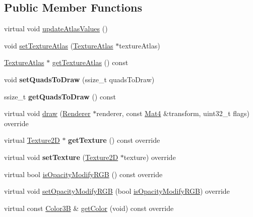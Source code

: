 \subsection*{Public Member Functions}
\begin{DoxyCompactItemize}
\item 
virtual void \hyperlink{classAtlasNode_ace1c88a0277a601bc02180da9641ebcd}{update\+Atlas\+Values} ()
\item 
void \hyperlink{classAtlasNode_ae008de73e7b0be719b73b57a94722894}{set\+Texture\+Atlas} (\hyperlink{classTextureAtlas}{Texture\+Atlas} $\ast$texture\+Atlas)
\item 
\hyperlink{classTextureAtlas}{Texture\+Atlas} $\ast$ \hyperlink{classAtlasNode_adce0f217e64e54bb095835acbea6174f}{get\+Texture\+Atlas} () const
\item 
\mbox{\label{classAtlasNode_a75735e107d32bdd019216b8b3a706467}} 
void {\bfseries set\+Quads\+To\+Draw} (ssize\+\_\+t quads\+To\+Draw)
\item 
\mbox{\label{classAtlasNode_a5fd045ec7e53606e5f58947359a3c332}} 
ssize\+\_\+t {\bfseries get\+Quads\+To\+Draw} () const
\item 
virtual void \hyperlink{classAtlasNode_aa396ca085059861b67e3ad9471de797c}{draw} (\hyperlink{classRenderer}{Renderer} $\ast$renderer, const \hyperlink{classMat4}{Mat4} \&transform, uint32\+\_\+t flags) override
\item 
\mbox{\label{classAtlasNode_a2f3cbc0c526c36bba08950158672b35e}} 
virtual \hyperlink{classTexture2D}{Texture2D} $\ast$ {\bfseries get\+Texture} () const override
\item 
\mbox{\label{classAtlasNode_ab6631fcde0f4849b47a93667b10c02e8}} 
virtual void {\bfseries set\+Texture} (\hyperlink{classTexture2D}{Texture2D} $\ast$texture) override
\item 
virtual bool \hyperlink{classAtlasNode_a3aa161e8abaff7422b7f9ef895f9439d}{is\+Opacity\+Modify\+R\+GB} () const override
\item 
virtual void \hyperlink{classAtlasNode_adb5151b64bb92b157133f9efb07124a8}{set\+Opacity\+Modify\+R\+GB} (bool \hyperlink{classAtlasNode_a3aa161e8abaff7422b7f9ef895f9439d}{is\+Opacity\+Modify\+R\+GB}) override
\item 
virtual const \hyperlink{structColor3B}{Color3B} \& \hyperlink{classAtlasNode_a9d19a5b168ff065c4cb565a94f9f3d7f}{get\+Color} (void) const override

\end{DoxyCompactItemize}
